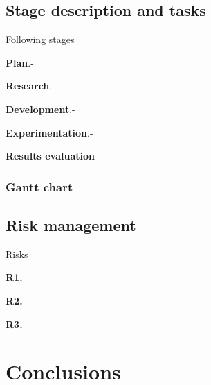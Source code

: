 \documentclass[a4paper]{article}
\begin{document}
\subsection{Stage description and tasks}
\label{sec:stage}

Following stages

\textbf{Plan}.- 

\textbf{Research}.- 

\textbf{Development}.-

\textbf{Experimentation}.-

\textbf{Results evaluation}

\subsubsection{Gantt chart}

\subsection{Risk management}

Risks

\textbf{R1.}

\textbf{R2.}

\textbf{R3.}

\section{Conclusions}
\end{document}
